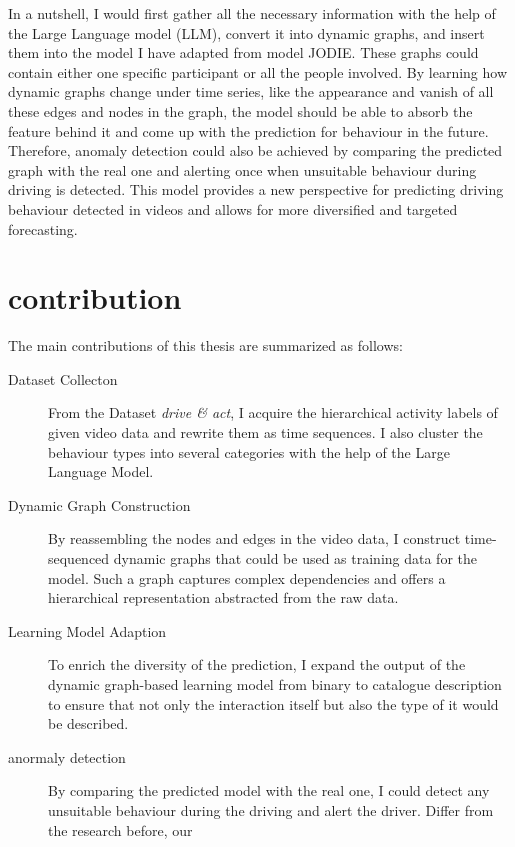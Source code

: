In a nutshell, I would first gather all the necessary information with the help of the Large Language model (LLM), convert it into dynamic graphs, and insert them into the model I have adapted from model JODIE. These graphs could contain either one specific participant or all the people involved. By learning how dynamic graphs change under time series, like the appearance and vanish of all these edges and nodes in the graph, the model should be able to absorb the feature behind it and come up with the prediction for behaviour in the future. Therefore, anomaly detection could also be achieved by comparing the predicted graph with the real one and alerting once when unsuitable behaviour during driving is detected. This model provides a new perspective for predicting driving behaviour detected in videos and allows for more diversified and targeted forecasting.


\section{contribution}
The main contributions of this thesis are summarized as follows:
\begin{description}
    \item[Dataset Collecton] From the Dataset \textit{drive \& act}, I acquire the hierarchical activity labels of given video data and rewrite them as time sequences. I also cluster the behaviour types into several categories with the help of the Large Language Model.
    \item[Dynamic Graph Construction] By reassembling the nodes and edges in the video data, I construct time-sequenced dynamic graphs that could be used as training data for the model. Such a graph captures complex dependencies and offers a hierarchical representation abstracted from the raw data.
    \item[Learning Model Adaption] To enrich the diversity of the prediction, I expand the output of the dynamic graph-based learning model from binary to catalogue description to ensure that not only the interaction itself but also the type of it would be described.
    \item[anormaly detection] By comparing the predicted model with the real one, I could detect any unsuitable behaviour during the driving and alert the driver. Differ from the research before, our 
\end{description}
    
    



